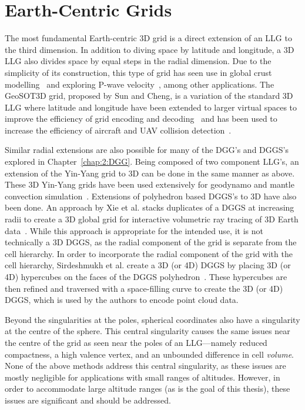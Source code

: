 \section{Earth-Centric Grids} \label{chap:3:earthCentric}
The most fundamental Earth-centric 3D grid is a direct extension of an LLG to the third dimension.
In addition to diving space by latitude and longitude, a 3D LLG also divides space by equal steps in the radial dimension.
Due to the simplicity of its construction, this type of grid has seen use in global crust modelling~\cite{bassin2000current} and exploring P-wave velocity~\cite{zhao2004global}, among other applications.
The GeoSOT3D grid, proposed by Sun and Cheng, is a variation of the standard 3D LLG where latitude and longitude have been extended to larger virtual spaces to improve the efficiency of grid encoding and decoding~\cite{sun20153d} and has been used to increase the efficiency of aircraft and UAV collision detection~\cite{miao2019low, zhai2019collision}.


Similar radial extensions are also possible for many of the DGG's and DGGS's explored in Chapter~\ref{chap:2:DGG}.
Being composed of two component LLG's, an extension of the Yin-Yang grid to 3D can be done in the same manner as above.
These 3D Yin-Yang grids have been used extensively for geodynamo and mantle convection simulation~\cite{yoshida2004application, kageyama2005geodynamo, tackley2008modelling}.
Extensions of polyhedron based DGGS's to 3D have also been done.
An approach by Xie et al. stacks duplicates of a DGGS at increasing radii to create a 3D global grid for interactive volumetric ray tracing of 3D Earth data~\cite{xie2013interactive}.
While this approach is appropriate for the intended use, it is not technically a 3D DGGS, as the radial component of the grid is separate from the cell hierarchy.
In order to incorporate the radial component of the grid with the cell hierarchy, Sirdeshmukh et al. create a 3D (or 4D) DGGS by placing 3D (or 4D) hypercubes on the faces of the DGGS polyhedron~\cite{sirdeshmukh2019utilizing}.
These hypercubes are then refined and traversed with a space-filling curve to create the 3D (or 4D) DGGS, which is used by the authors to encode point cloud data.


Beyond the singularities at the poles, spherical coordinates also have a singularity at the centre of the sphere.
This central singularity causes the same issues near the centre of the grid as seen near the poles of an LLG---namely reduced compactness, a high valence vertex, and an unbounded difference in cell \textit{volume}.
None of the above methods address this central singularity, as these issues are mostly negligible for applications with small ranges of altitudes.
However, in order to accommodate large altitude ranges (as is the goal of this thesis), these issues are significant and should be addressed.


